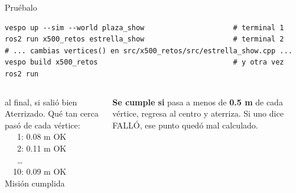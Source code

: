 \begin{frame}[fragile]{Pruébalo}
  \begin{lstlisting}[style=bash]
vespo up --sim --world plaza_show                     # terminal 1
ros2 run x500_retos estrella_show                     # terminal 2
# ... cambias vertices() en src/x500_retos/src/estrella_show.cpp ...
vespo build x500_retos                                # y otra vez ros2 run
  \end{lstlisting}
  \begin{columns}[c]
    \begin{terminal}{al final, si salió bien}
Aterrizado. Qué tan cerca pasó de cada vértice:\\
\ \ \ 1: 0.08 m OK\\
\ \ \ 2: 0.11 m OK\\
\ \ \ \ldots\\
\ \ 10: 0.09 m OK\\
Misión cumplida
    \end{terminal}
    \small
    \textbf{Se cumple si} pasa a menos de \textbf{0.5 m} de cada vértice, regresa al centro y aterriza. Si uno dice
    \textcolor{rojo}{FALLÓ}, ese punto quedó mal calculado.
  \end{columns}
\end{frame}

